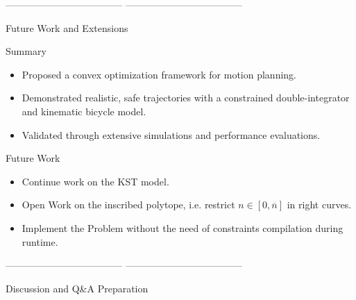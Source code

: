 \documentclass[shortpres,aspectratio=43]{beamer}
\newcommand\blfootnote[1]{%
  \begingroup
  \renewcommand\thefootnote{}\footnote{#1}%
  \addtocounter{footnote}{-1}%
  \endgroup
}
\begin{document}
------------------------------------
------------------------------------
\begin{frame}{Future Work and Extensions}

\begin{frame}{Summary}
  \begin{itemize}
    \item Proposed a convex optimization framework for motion planning.
    \item Demonstrated realistic, safe trajectories with a constrained double-integrator and kinematic bicycle model.
    \item Validated through extensive simulations and performance evaluations.
  \end{itemize}
\end{frame}

\begin{frame}{Future Work}
  \begin{itemize}
    \item Continue work on the KST model.
    \item Open Work on the inscribed polytope, i.e. restrict $n\in[0,\overline{n}]$ in right curves.
    \item Implement the Problem without the need of constraints compilation during runtime.
  \end{itemize}
\end{frame}

------------------------------------
------------------------------------
\begin{frame}{Discussion and Q\&A Preparation}


\end{frame}
\end{frame}
\end{document}
